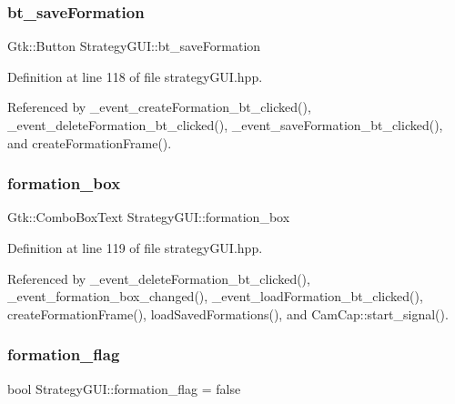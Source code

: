 \mbox{\label{class_strategy_g_u_i_ae68d7475f55a82e46d74eb8b3cd53b9e}} 
\subsubsection{\texorpdfstring{bt\+\_\+save\+Formation}{bt\_saveFormation}}
{\footnotesize\ttfamily Gtk\+::\+Button Strategy\+G\+U\+I\+::bt\+\_\+save\+Formation}



Definition at line 118 of file strategy\+G\+U\+I.\+hpp.



Referenced by \+\_\+event\+\_\+create\+Formation\+\_\+bt\+\_\+clicked(), \+\_\+event\+\_\+delete\+Formation\+\_\+bt\+\_\+clicked(), \+\_\+event\+\_\+save\+Formation\+\_\+bt\+\_\+clicked(), and create\+Formation\+Frame().

\mbox{\label{class_strategy_g_u_i_a0f2ab3a2cdca1663def9c4ec1e366a5d}} 
\subsubsection{\texorpdfstring{formation\+\_\+box}{formation\_box}}
{\footnotesize\ttfamily Gtk\+::\+Combo\+Box\+Text Strategy\+G\+U\+I\+::formation\+\_\+box}



Definition at line 119 of file strategy\+G\+U\+I.\+hpp.



Referenced by \+\_\+event\+\_\+delete\+Formation\+\_\+bt\+\_\+clicked(), \+\_\+event\+\_\+formation\+\_\+box\+\_\+changed(), \+\_\+event\+\_\+load\+Formation\+\_\+bt\+\_\+clicked(), create\+Formation\+Frame(), load\+Saved\+Formations(), and Cam\+Cap\+::start\+\_\+signal().

\mbox{\label{class_strategy_g_u_i_aaac145125516fb8b7fe7137db18cdb58}} 
\subsubsection{\texorpdfstring{formation\+\_\+flag}{formation\_flag}}
{\footnotesize\ttfamily bool Strategy\+G\+U\+I\+::formation\+\_\+flag = false}



